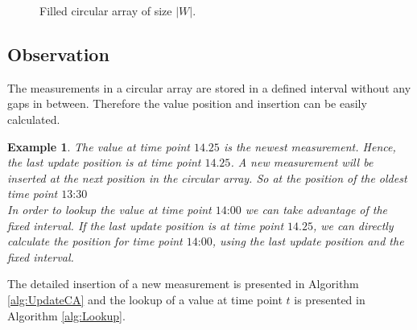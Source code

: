 \documentclass[abstracton,12pt]{scrreprt}
\newtheorem{example}{Example}
\begin{document}
\begin{itemize}
\begin{figure}[H]
		\vspace{2mm}
		\caption{Filled circular array of size $|W|$.}
		\label{fig:cat}
	\end{figure}
\end{itemize}

\subsection{Observation}
The measurements in a circular array are stored in a defined interval without any gaps in between. Therefore the value position and insertion can be easily calculated.
\begin{example}
The value at time point $\text{14.25}$ is the newest measurement. Hence, the last update position is at time point $\text{14.25}$. A new measurement will be inserted at the next position in the circular array. So at the position of the oldest time point $\text{13:30}$\\
In order to lookup the value at time point $\text{14:00}$ we can take advantage of the fixed interval. If the last update position is at time point $\text{14.25}$, we can directly calculate the position for time point $\text{14:00}$, using the last update position and the fixed interval.
\end{example} 
The detailed insertion of a new measurement is presented in Algorithm \ref{alg:UpdateCA} and the lookup of a value at time point $t$ is presented in Algorithm \ref{alg:Lookup}.
\end{document}
